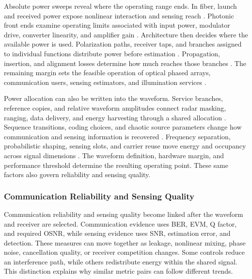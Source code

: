 Absolute power sweeps reveal where the operating range ends. In fiber, launch
and received power expose nonlinear interaction and sensing reach
\cite{OISAC_SCR00473,OISAC_SCR01079,OISAC_SCR01180}. Photonic front ends examine
operating limits associated with input power, modulator drive, converter
linearity, and amplifier gain
\cite{OISAC_SCR00631,OISAC_SCR00986,OISAC_SCR01012,OISAC_SCR01151}.
Architecture then decides where the available power is used. Polarization
paths, receiver taps, and branches assigned to individual functions distribute
power before estimation
\cite{OISAC_SCR00346,OISAC_SCR01072,OISAC_SCR01075}. Propagation, insertion,
and alignment losses determine how much reaches those branches
\cite{OISAC_SCR00002,OISAC_SCR00218,OISAC_SCR00506}. The remaining margin sets
the feasible operation of optical phased arrays, communication users, sensing
estimators, and illumination services
\cite{OISAC_SCR00940,OISAC_SCR00941,OISAC_SCR00980,OISAC_SCR01028}.

Power allocation can also be written into the waveform. Service branches,
reference copies, and relative waveform amplitudes connect radar masking,
ranging, data delivery, and energy harvesting through a shared allocation
\cite{OISAC_SCR00893,OISAC_SCR00919,OISAC_SCR01032,OISAC_SCR01165}. Sequence
transitions, coding choices, and chaotic source parameters change how
communication and sensing information is recovered
\cite{OISAC_SCR00052,OISAC_SCR00460,OISAC_SCR01105}. Frequency separation,
probabilistic shaping, sensing slots, and carrier reuse move energy and
occupancy across signal dimensions
\cite{OISAC_SCR01009,OISAC_SCR01020,OISAC_SCR01030,OISAC_SCR01093}. The
waveform definition, hardware margin, and performance threshold determine the
resulting operating point. These same factors also govern reliability and
sensing quality.

\subsubsection{Communication Reliability and Sensing Quality}

Communication reliability and sensing quality become linked after the waveform
and receiver are selected. Communication evidence uses BER, EVM, Q factor, and
required OSNR, while sensing evidence uses SNR, estimation error, and detection.
These measures can move together as leakage, nonlinear mixing, phase noise,
cancellation quality, or receiver competition changes. Some controls reduce an
interference path, while others redistribute energy within the shared signal.
This distinction explains why similar metric pairs can follow different trends.

